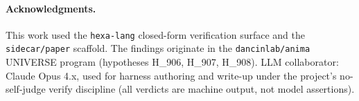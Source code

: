 \documentclass[11pt,a4paper]{article}
\begin{document}
\paragraph{Acknowledgments.}
This work used the \texttt{hexa-lang} closed-form verification surface and the
\texttt{sidecar/paper} scaffold. The findings originate in the
\texttt{dancinlab/anima} UNIVERSE program (hypotheses H\_906, H\_907, H\_908).
LLM collaborator: Claude Opus 4.x, used for harness authoring and write-up under
the project's no-self-judge verify discipline (all verdicts are machine output,
not model assertions).



\end{document}
